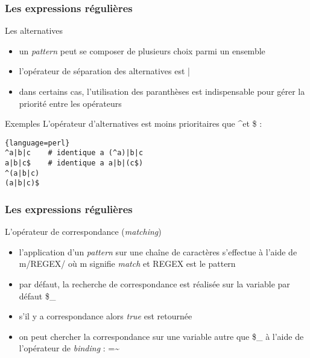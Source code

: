 \begin{frame}[fragile]
  \frametitle{Les expressions régulières}

  \begin{block}{Les alternatives}
    \begin{itemize}
    \item un \textit{pattern} peut se composer de plusieurs choix parmi
      un ensemble
    \item l'opérateur de séparation des alternatives est |
    \item dans certains cas, l'utilisation des paranthèses est indispensable
      pour gérer la priorité entre les opérateurs
    \end{itemize}
  \end{block}

  \begin{exampleblock}{Exemples}
    L'opérateur d'alternatives est moins prioritaires que \textasciicircum et
    \$ :
    \begin{lstlisting}{language=perl}
^a|b|c    # identique a (^a)|b|c
a|b|c$    # identique a a|b|(c$)
^(a|b|c)
(a|b|c)$
    \end{lstlisting}
  \end{exampleblock}
\end{frame}

\begin{frame}[fragile]
  \frametitle{Les expressions régulières}

  \begin{block}{L'opérateur de correspondance (\textit{matching})}
    \begin{itemize}
    \item l'application d'un \textit{pattern} sur une chaîne de caractères
      s'effectue à l'aide de m/REGEX/ où m signifie \textit{match} et REGEX est
      le pattern
    \item par défaut, la recherche de correspondance est réalisée sur la
      variable par défaut \$\_
    \item s'il y a correspondance alors \textit{true} est retournée
    \item on peut chercher la correspondance sur une variable autre que \$\_ à
      l'aide de l'opérateur de \textit{binding} : =\textasciitilde
    \end{itemize}
  \end{block}
\end{frame}

